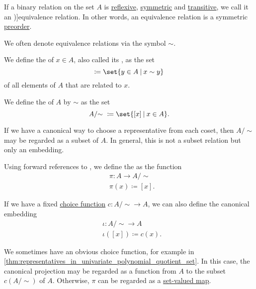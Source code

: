 \begin{definition}\label{def:equivalence_relation}\mimprovised
  If a binary relation on the set \( A \) is \hyperref[def:binary_relation/reflexive]{reflexive}, \hyperref[def:binary_relation/symmetric]{symmetric} and \hyperref[def:binary_relation/transitive]{transitive}, we call it an \term[ru=отношение эквивалентности (\cite[28]{Винберг2014КурсАлгебры})]{equivalence relation}. In other words, an equivalence relation is a symmetric \hyperref[def:preordered_set]{preorder}.

  We often denote equivalence relations via the symbol \( \sim \).

  \begin{thmenum}
     We define the  of \( x \in A \), also called its , as the set
    \begin{equation*}
      [x] \coloneqq \set{ y \in A \given x \sim y }
    \end{equation*}
    of all elements of \( A \) that are related to \( x \).

     We define the  of \( A \) by \( \sim \) as the set
    \begin{equation*}
      A / {\sim} \ \coloneqq \set{ [x] \given x \in A }.
    \end{equation*}

     If we have a canonical way to choose a representative from each coset, then \( A / {\sim} \) may be regarded as a subset of \( A \). In general, this is not a subset relation but only an embedding.

     Using forward references to , we define the  as the function
    \begin{equation*}
      \begin{aligned}
        &\pi: A \to A / {\sim}  \\
        &\pi(x) \coloneqq [x].
      \end{aligned}
    \end{equation*}

    If we have a fixed \hyperref[def:choice_function]{choice function} \( c: A / {\sim} \to A \), we can also define the canonical embedding
    \begin{equation*}
      \begin{aligned}
        &\iota: A / {\sim} \to A \\
        &\iota([x]) \coloneqq c(x).
      \end{aligned}
    \end{equation*}

    We sometimes have an obvious choice function, for example in \cref{thm:representatives_in_univariate_polynomial_quotient_set}. In this case, the canonical projection may be regarded as a function from \( A \) to the subset \( c(A / {\sim}) \) of \( A \). Otherwise, \( \pi \) can be regarded as a \hyperref[def:function]{set-valued map}.
  \end{thmenum}
\end{definition}

